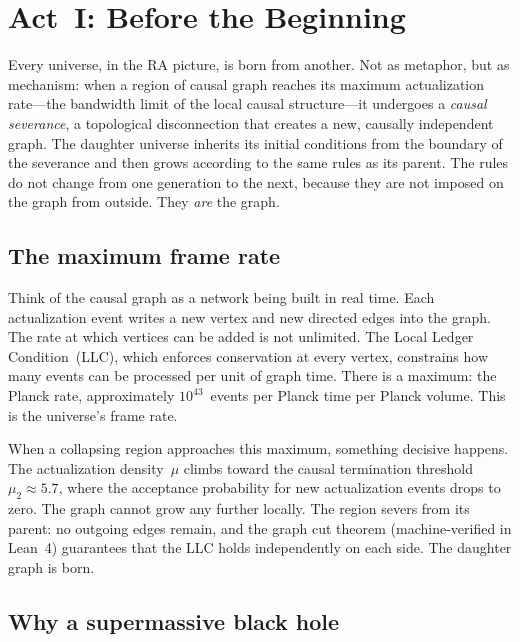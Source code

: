 \documentclass[11pt,a4paper]{article}
\theoremstyle{plain}
\theoremstyle{definition}
\theoremstyle{remark}
\begin{document}
\section{Act~I: Before the Beginning}\label{sec:act1}

Every universe, in the RA picture, is born from another.  Not as metaphor,
but as mechanism: when a region of causal graph reaches its maximum
actualization rate---the bandwidth limit of the local causal structure---it
undergoes a \emph{causal severance}, a topological disconnection that
creates a new, causally independent graph.  The daughter universe inherits
its initial conditions from the boundary of the severance and then grows
according to the same rules as its parent.  The rules do not change from
one generation to the next, because they are not imposed on the graph from
outside.  They \emph{are} the graph.

\subsection{The maximum frame rate}\label{sec:framerate}

Think of the causal graph as a network being built in real time.  Each
actualization event writes a new vertex and new directed edges into the
graph.  The rate at which vertices can be added is not unlimited.  The
Local Ledger Condition~(LLC), which enforces conservation at every vertex,
constrains how many events can be processed per unit of graph time.  There
is a maximum: the Planck rate, approximately $10^{43}$~events per Planck
time per Planck volume.  This is the universe's frame rate.

When a collapsing region approaches this maximum, something decisive
happens.  The actualization density~$\mu$ climbs toward the causal
termination threshold $\mu_2 \approx 5.7$, where the acceptance
probability for new actualization events drops to zero.  The graph cannot
grow any further locally.  The region severs from its parent: no outgoing
edges remain, and the graph cut theorem (machine-verified in Lean~4)
guarantees that the LLC holds independently on each side.  The daughter
graph is born.

\subsection{Why a supermassive black hole}\label{sec:smbh}
\end{document}
